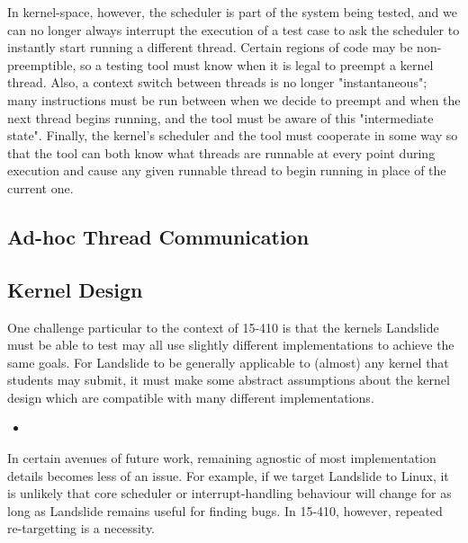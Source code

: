 \documentclass[10pt,twocolumn]{article}
\begin{document}
In kernel-space, however, the scheduler is part of the system being tested, and we can no longer always interrupt the execution of a test case to ask the scheduler to instantly start running a different thread.
Certain regions of code may be non-preemptible, so a testing tool must know when it is legal to preempt a kernel thread.
Also, a context switch between threads is no longer "instantaneous"; many instructions must be run between when we decide to preempt and when the next thread begins running, and the tool must be aware of this "intermediate state". %
Finally, the kernel's scheduler and the tool must cooperate in some way so that the tool can both know what threads are runnable at every point during execution and cause any given runnable thread to begin running in place of the current one.

\subsection{Ad-hoc Thread Communication}

\subsection{Kernel Design}

One challenge particular to the context of 15-410 is that the kernels Landslide must be able to test may all use slightly different implementations to achieve the same goals. For Landslide to be generally applicable to (almost) any kernel that students may submit, it must make some abstract assumptions about the kernel design which are compatible with many different implementations.

\begin{itemize}
	\item
\end{itemize}

In certain avenues of future work, remaining agnostic of most implementation details becomes less of an issue. For example, if we target Landslide to Linux, it is unlikely that core scheduler or interrupt-handling behaviour will change for as long as Landslide remains useful for finding bugs. In 15-410, however, repeated re-targetting is a necessity.


\end{document}
